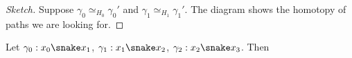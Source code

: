 \documentclass{article}
\numberwithin{nthm}{subsection}
\begin{document}
\begin{proof}[Sketch]
    Suppose $\gamma_0 \simeq_{H_0} \gamma_0'$ and $\gamma_1 \simeq_{H_1} \gamma_1'$.
    The diagram shows the homotopy of paths we are looking for.
\end{proof}

\begin{nprop}
    Let $\gamma_0:x_0 \snake x_1$, $\gamma_1: x_1 \snake x_2$, $\gamma_2: x_2 \snake x_3$.
    Then
\end{nprop}
\end{document}

